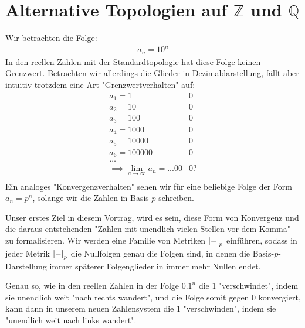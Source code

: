 \documentclass{report}
\newcommand*{\newpar}{\par\vspace{\baselineskip}\noindent}
\newcommand{\bQ}{\mathbb{Q}}
\newcommand{\bZ}{\mathbb{Z}}
\begin{document}
	\chapter{Alternative Topologien auf $\bZ$ und ${\bQ}$}
	Wir betrachten die Folge:
	\begin{align*}
		a_n = 10^n
	\end{align*}
	In den reellen Zahlen mit der Standardtopologie hat diese Folge keinen Grenzwert. Betrachten wir allerdings die Glieder in Dezimaldarstellung, fällt aber intuitiv trotzdem eine Art "Grenzwertverhalten" auf:
	\begin{align*}
		a_1 = 1&0\\
		a_2 = 10&0\\
		a_3 = 100&0\\
		a_4 = 1000&0\\
		a_5 = 10000&0\\
		a_6 = 100000&0\\
		\hdots\\
		\implies \lim_{a \to \infty} a_n= ...00&0?\\
	\end{align*}
	Ein analoges "Konvergenzverhalten" sehen wir für eine beliebige Folge der Form $a_n = p^n$, solange wir die Zahlen in Basis $p$ schreiben.
	\newpar
	Unser erstes Ziel in diesem Vortrag, wird es sein, diese Form von Konvergenz und die daraus entstehenden "Zahlen mit unendlich vielen Stellen vor dem Komma" zu formalisieren. Wir werden eine Familie von Metriken $\abs{-}_p$ einführen, sodass in jeder Metrik $\abs{-}_p$ die Nullfolgen genau die Folgen sind, in denen die Basis-$p$-Darstellung immer späterer Folgenglieder in immer mehr Nullen endet.
	\newpar
	Genau so, wie in den reellen Zahlen in der Folge $0.1^n$ die $1$ "verschwindet", indem sie unendlich weit "nach rechts wandert", und die Folge somit gegen $0$ konvergiert, kann dann in unserem neuen Zahlensystem die $1$ "verschwinden", indem sie "unendlich weit nach links wandert".
	\clearpage
\end{document}
